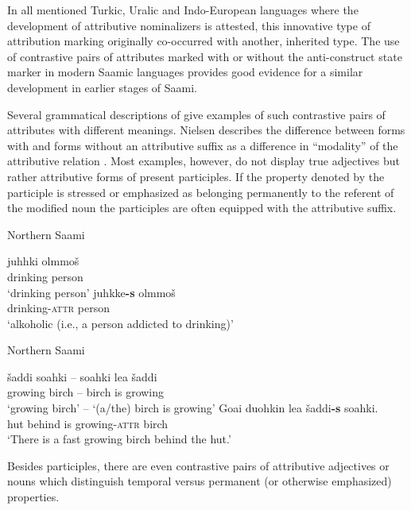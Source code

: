 {In all mentioned Turkic, Uralic and Indo-European languages where the development of attributive nominalizers is attested, this innovative type of attribution marking originally co-occurred with another, inherited type. The use of contrastive pairs of attributes marked with or without the anti\hyp{}construct state marker in modern Saamic languages provides good evidence for a similar development in earlier stages of Saami.

Several grammatical descriptions of  give examples of such contrastive pairs of attributes with different meanings. Nielsen describes the difference between forms with and forms without an attributive suffix as a difference in “modality” of the attributive relation \cite[203]{nielsen1945b}. Most examples, however, do not display true adjectives but rather attributive forms of present participles. If the property denoted by the participle is stressed or emphasized as belonging permanently to the referent of the modified noun the participles are often equipped with the attributive suffix.
\begin{exe}
\ex
\begin{xlist}
\ex \rm{Northern Saami \citep[204]{nielsen1945b}}
\begin{xlist}
\ex
\gll 	juhhki olmmoš\\
	drinking person\\
\glt	 ‘drinking person’
\ex	
\gll	juhkke\textbf{-s} olmmoš\\
	drinking-\textsc{attr} person\\
\glt	‘alkoholic (i.e., a person addicted to drinking)’
\end{xlist}
\ex \rm{Northern Saami \citep[282]{bartens1989}}
\begin{xlist}
\ex 	
\gll	šaddi soahki – soahki lea šaddi\\
 	growing birch – birch is growing\\
\glt	‘growing birch’ – ‘(a/the) birch is growing’
\ex
\gll	Goa{\dj}i duohkin lea šaddi\textbf{-s} soahki.\\
	hut behind is growing-\textsc{attr} birch\\
\glt	‘There is a fast growing birch behind the hut.’
\end{xlist}
\end{xlist}
\end{exe}
Besides participles, there are even contrastive pairs of attributive adjectives or nouns which distinguish temporal versus permanent (or otherwise emphasized) properties.
}
